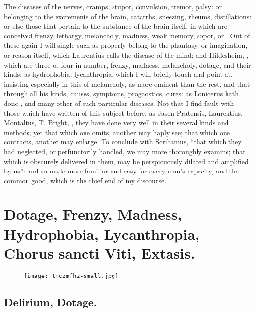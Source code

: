 The diseases of the nerves, cramps, stupor, convulsion, tremor, palsy: or
belonging to the excrements of the brain, catarrhs, sneezing, rheums,
distillations: or else those that pertain to the substance of the brain itself,
in which are conceived frenzy, lethargy, melancholy, madness, weak memory,
sopor, or . Out of these again I will single
such as properly belong to the phantasy, or imagination, or reason itself,
which Laurentius calls the disease of the mind; and
Hildesheim, , which are three or four in number, frenzy,
madness, melancholy, dotage, and their kinds: as hydrophobia, lycanthropia,
 which I will briefly touch and point at, insisting especially in this
of melancholy, as more eminent than the rest, and that through all his kinds,
causes, symptoms, prognostics, cures: as Lonicerus hath done
, and many other of such particular
diseases. Not that I find fault with those which have written of this subject
before, as Jason Pratensis, Laurentius, Montaltus, T. Bright, \etc{}, they have
done very well in their several kinds and methods; yet that which one omits,
another may haply see; that which one contracts, another may enlarge. To
conclude with Scribanius, \enquote{that which they had neglected,
or perfunctorily handled, we may more thoroughly examine; that which is
obscurely delivered in them, may be perspicuously dilated and amplified by us}:
and so made more familiar and easy for every man's capacity, and the common
good, which is the chief end of my discourse.

\section[Madness]{Dotage, Frenzy, Madness, Hydrophobia, Lycanthropia, Chorus sancti Viti, Extasis.}
\begin{figure}[H]
  \begingroup
  \centering
  \texttt{[image: tmczmfhz-small.jpg]}
  \label{fig:madness}
\end{figure}

\subsection{Delirium, Dotage.}

